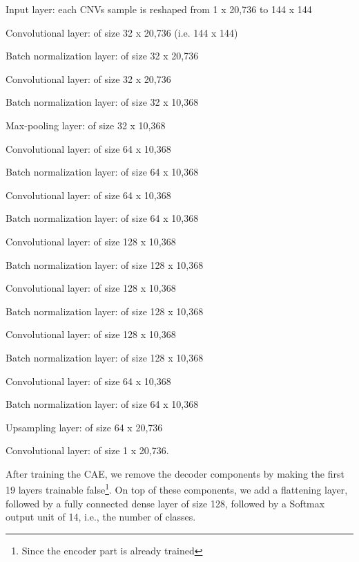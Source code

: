 \begin{enumerate}[noitemsep]
    \scriptsize{
        \item Input layer: each CNVs sample is reshaped from 1 x 20,736 to 144 x 144
        \item Convolutional layer: of size 32 x 20,736 (i.e. 144 x 144) 
        \item Batch normalization layer: of size 32 x 20,736
        \item Convolutional layer: of size 32 x 20,736
        \item Batch normalization layer: of size 32 x 10,368
        \item Max-pooling layer: of size 32 x 10,368
        \item Convolutional layer: of size 64 x 10,368
        \item Batch normalization layer: of size 64 x 10,368
        \item Convolutional layer: of size 64 x 10,368
        \item Batch normalization layer: of size 64 x 10,368
        \item Convolutional layer: of size 128 x 10,368
        \item Batch normalization layer: of size 128 x 10,368
        \item Convolutional layer: of size 128 x 10,368
        \item Batch normalization layer: of size 128 x 10,368
        \item Convolutional layer: of size 128 x 10,368
        \item Batch normalization layer: of size 128 x 10,368
        \item Convolutional layer: of size 64 x 10,368
        \item Batch normalization layer: of size 64 x 10,368
        \item Upsampling layer: of size 64 x 20,736 
        \item Convolutional layer: of size 1 x 20,736.}
\end{enumerate}

\hspace*{3.5mm} After training the CAE, we remove the decoder components by making the first 19 layers trainable false\footnote{Since the encoder part is already trained}. On top of these components, we add a flattening layer, followed by a fully connected dense layer of size 128, followed by a Softmax output unit of 14, i.e., the number of classes. 

